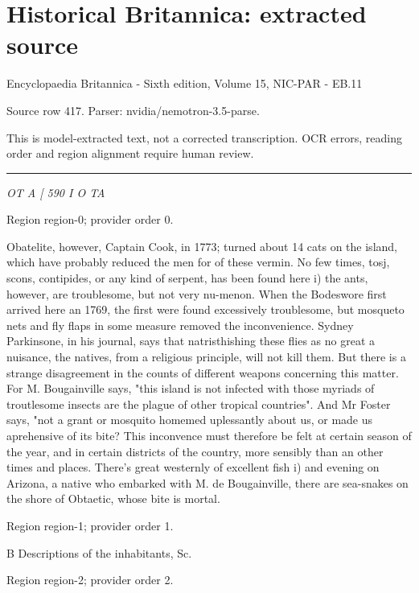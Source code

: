 \documentclass[11pt]{article}
\begin{document}
\section*{Historical Britannica: extracted source}
Encyclopaedia Britannica - Sixth edition, Volume 15, NIC-PAR - EB.11\par
{\small Source row 417. Parser: nvidia/nemotron-3.5-parse.\par}
{\small This is model-extracted text, not a corrected transcription. OCR errors, reading order and region alignment require human review.\par}
\hrule\medskip
{\small\itshape OT A [ 590 I O TA\par}

{\scriptsize\color{gray} Region region-0; provider order 0.\par}
\medskip

Obatelite, however, Captain Cook, in 1773; turned about 14 cats on the island, which have probably reduced the men for of these vermin. No few times, tosj, scons, contipides, or any kind of serpent, has been found here i) the ants, however, are troublesome, but not very nu-menon. When the Bodeswore first arrived here an 1769, the first were found excessively troublesome, but mosqueto nets and fly flaps in some measure removed the inconvenience. Sydney Parkinsone, in his journal, says that natristhishing these flies as no great a nuisance, the natives, from a religious principle, will not kill them. But there is a strange disagreement in the counts of different weapons concerning this matter. For M. Bougainville says, "this island is not infected with those myriads of troutlesome insects are the plague of other tropical countries". And Mr Foster says, "not a grant or mosquito homemed uplessantly about us, or made us aprehensive of its bite? This inconvence must therefore be felt at certain season of the year, and in certain districts of the country, more sensibly than an other times and places. There's great westernly of excellent fish i) and evening on Arizona, a native who embarked with M. de Bougainville, there are sea-snakes on the shore of Obtaetic, whose bite is mortal.
\par

{\scriptsize\color{gray} Region region-1; provider order 1.\par}
\medskip

B Descriptions of the inhabitants, Sc.
\par

{\scriptsize\color{gray} Region region-2; provider order 2.\par}
\medskip
\end{document}
